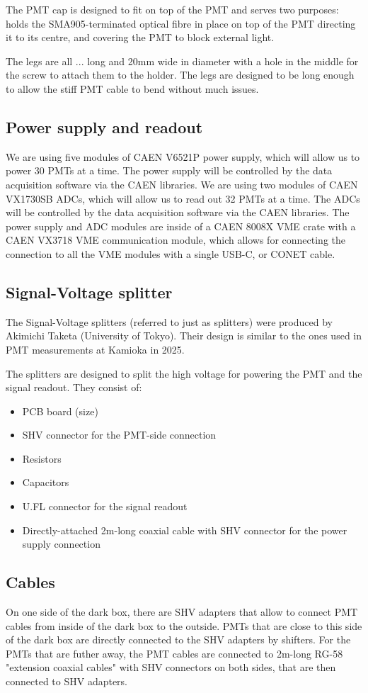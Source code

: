 \documentclass[12pt,a4paper]{article}
\begin{document}
The PMT cap is designed to fit on top of the PMT and serves two purposes: holds the SMA905-terminated optical fibre in place on top of the PMT directing it to its centre, and covering the PMT to block external light.

The legs are all ... long and 20mm wide in diameter with a hole in the middle for the screw to attach them to the holder. The legs are designed to be long enough to allow the stiff PMT cable to bend without much issues.

\subsection{Power supply and readout}
We are using five modules of CAEN V6521P power supply, which will allow us to power 30 PMTs at a time. The power supply will be controlled by the data acquisition software via the CAEN libraries. We are using two modules of CAEN VX1730SB ADCs, which will allow us to read out 32 PMTs at a time. The ADCs will be controlled by the data acquisition software via the CAEN libraries. The power supply and ADC modules are inside of a CAEN 8008X VME crate with a CAEN VX3718 VME communication module, which allows for connecting the connection to all the VME modules with a single USB-C, or CONET cable.

\subsection{Signal-Voltage splitter}\label{sec:SigVoltSplitter}
The Signal-Voltage splitters (referred to just as splitters) were produced by Akimichi Taketa (University of Tokyo). Their design is similar to the ones used in PMT measurements at Kamioka in 2025.

The splitters are designed to split the high voltage for powering the PMT and the signal readout. They consist of:
\begin{itemize}
  \item PCB board (size)
  \item SHV connector for the PMT-side connection
  \item Resistors
  \item Capacitors
  \item U.FL connector for the signal readout
  \item Directly-attached 2m-long coaxial cable with SHV connector for the power supply connection
\end{itemize}

\subsection{Cables}
On one side of the dark box, there are SHV adapters that allow to connect PMT cables from inside of the dark box to the outside. PMTs that are close to this side of the dark box are directly connected to the SHV adapters by shifters. For the PMTs that are futher away, the PMT cables are connected to 2m-long RG-58 "extension coaxial cables" with SHV connectors on both sides, that are then connected to SHV adapters.
\end{document}
